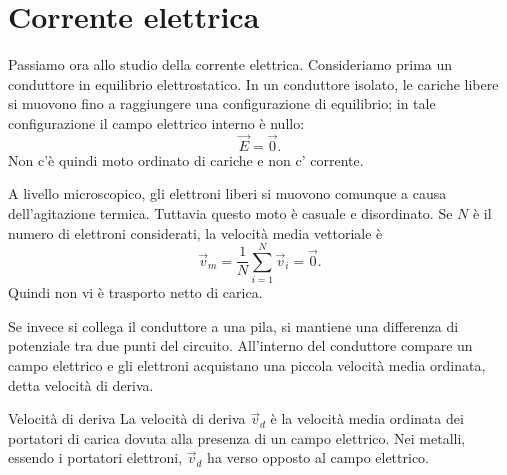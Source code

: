 \documentclass[a4paper]{article}
\begin{document}
\section{Corrente elettrica}

Passiamo ora allo studio della corrente elettrica. Consideriamo prima un conduttore in equilibrio elettrostatico. In un conduttore isolato, le cariche libere si muovono fino a raggiungere una configurazione di equilibrio; in tale configurazione il campo elettrico interno è nullo:
\[
    \vec{E}=\vec{0}.
\]
Non c'è quindi moto ordinato di cariche e non c' corrente.

A livello microscopico, gli elettroni liberi si muovono comunque a causa dell'agitazione termica. Tuttavia questo moto è casuale e disordinato. Se \(N\) è il numero di elettroni considerati, la velocità media vettoriale è
\[
    \vec{v}_m=\frac{1}{N}\sum_{i=1}^N\vec{v}_i=\vec{0}.
\]
Quindi non vi è trasporto netto di carica.

\begin{center}
\end{center}

Se invece si collega il conduttore a una pila, si mantiene una differenza di potenziale tra due punti del circuito. All'interno del conduttore compare un campo elettrico e gli elettroni acquistano una piccola velocità media ordinata, detta velocità di deriva.

\begin{snippetdefinition}{Velocità di deriva}
    La velocità di deriva \(\vec{v}_d\) è la velocità media ordinata dei portatori di carica dovuta alla presenza di un campo elettrico. Nei metalli, essendo i portatori elettroni, \(\vec{v}_d\) ha verso opposto al campo elettrico.
\end{snippetdefinition}

\begin{center}
\end{center}
\end{document}
